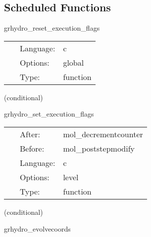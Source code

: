 \subsection*{Scheduled Functions}
\vspace{5mm}


\hspace{5mm} grhydro\_reset\_execution\_flags 

\hspace{5mm}{\it initially set execution flags to 'yeah, execute'! } 


\hspace{5mm}

 \begin{tabular*}{160mm}{cll} 
~ & Language:  & c \\ 
~ & Options:  & global \\ 
~ & Type:  & function \\ 
\end{tabular*} 


\vspace{5mm}

   (conditional) 

\hspace{5mm} grhydro\_set\_execution\_flags 

\hspace{5mm}{\it check if we need to execute rhs / post-step calculation } 


\hspace{5mm}

 \begin{tabular*}{160mm}{cll} 
~ & After:  & mol\_decrementcounter \\ 
~ & Before:  & mol\_poststepmodify \\ 
~ & Language:  & c \\ 
~ & Options:  & level \\ 
~ & Type:  & function \\ 
\end{tabular*} 


\vspace{5mm}

   (conditional) 

\hspace{5mm} grhydro\_evolvecoords 

\hspace{5mm}{\it evolve the coordinates for the comoving shift } 



